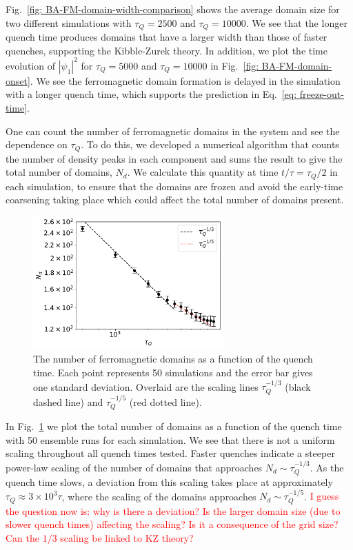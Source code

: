 Fig.~\ref{fig: BA-FM-domain-width-comparison} shows the average domain size
for two different simulations with $\tau_Q=2500$ and $\tau_Q=10000$.
We see that the longer quench time produces domains that have a
larger width than those of faster quenches, supporting the Kibble-Zurek theory.
In addition, we plot the time evolution of $|\psi_1|^2$ for $\tau_Q=5000$ and
$\tau_Q=10000$ in Fig.~\ref{fig: BA-FM-domain-onset}.
We see the ferromagnetic domain formation is delayed in the simulation
with a longer quench time, which supports the prediction in
Eq.~\eqref{eq: freeze-out-time}.

One can count the number of ferromagnetic domains in the system and see the
dependence on $\tau_Q$.
To do this, we developed a numerical algorithm that counts the number of
density peaks in each component and sums the result to give the total number of
domains, $N_d$.
We calculate this quantity at time $t/\tau=\tau_Q/2$ in each simulation, to
ensure that the domains are frozen and avoid the early-time coarsening
taking place which could affect the total number of domains present.
\begin{figure}
    \centering
    \includegraphics[width=0.65\textwidth]{gfx/ch-spin1/FM_domains_scaling.pdf}
    \caption{The number of ferromagnetic domains as a function of the
    quench time. Each point represents 50 simulations and the
    error bar gives one standard deviation. Overlaid are the scaling lines
    $\tau_Q^{-1/3}$ (black dashed line) and $\tau_Q^{-1/5}$ (red dotted line).}
    \label{fig: FM-domains-scaling}
\end{figure}
In Fig.~\ref{fig: FM-domains-scaling} we plot the total number of domains
as a function of the quench time with 50 ensemble runs for each simulation.
We see that there is not a uniform scaling throughout all quench times tested.
Faster quenches indicate a steeper power-law scaling of the number of domains
that approaches $N_d\sim\tau_Q^{-1/3}$.
As the quench time slows, a deviation from this scaling takes place at
approximately $\tau_Q\approx 3\times10^3\tau$, where the scaling of the domains
approaches $N_d\sim\tau_Q^{-1/5}$.
\textcolor{red}{I guess the question now is: why is there a deviation?
Is the larger domain size (due to slower quench times) affecting the scaling?
Is it a consequence of the grid size? Can the $1/3$ scaling be linked to KZ
theory?}

